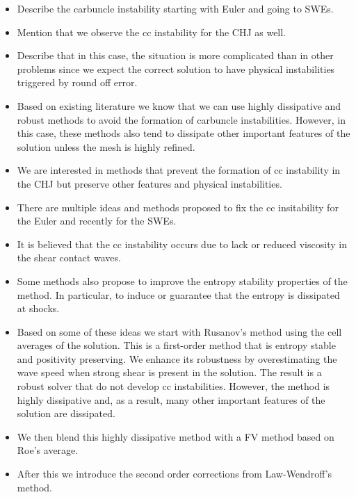 \documentclass[preprint, 11pt]{article}
\begin{document}
\begin{itemize}
  \item Describe the carbuncle instability starting with Euler and going to SWEs. 
  \item Mention that we observe the cc instability for the CHJ as well. 
  \item Describe that in this case, the situation is more complicated than in other problems since we 
    expect the correct solution to have physical instabilities triggered by round off error. 
  \item Based on existing literature we know that we can use highly dissipative and robust methods to 
    avoid the formation of carbuncle instabilities. However, in this case, these methods also tend to 
    dissipate other important features of the solution unless the mesh is highly refined. 
  \item We are interested in methods that prevent the formation of cc instability in the CHJ 
    but preserve other features and physical instabilities. 
  \item There are multiple ideas and methods proposed to fix the cc insitability for the Euler 
    and recently for the SWEs. 
  \item It is believed that the cc instability occurs due to lack or reduced viscosity in the shear contact waves. 
  \item Some methods also propose to improve the entropy stability properties of the method. In particular, to induce or guarantee that the entropy is dissipated at shocks. 
  \item Based on some of these ideas we start with Rusanov's method using the cell averages of the solution. 
    This is a first-order method that is entropy stable and positivity preserving. We enhance its robustness by 
    overestimating the wave speed when strong shear is present in the solution. The result is a robust solver 
    that do not develop cc instabilities. However, the method is highly dissipative and, as a result, 
    many other important features of the solution are dissipated. 
  \item We then blend this highly dissipative method with a FV method based on Roe's average. 
  \item After this we introduce the second order corrections from Law-Wendroff's method. 
\end{itemize}
\end{document}
